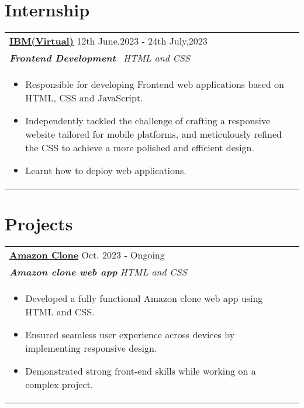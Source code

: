 \documentclass[a4paper,8pt]{article}
\begin{document}
\section{Internship}
\begin{tabularx}{\linewidth}{ @{}l r@{} }
\textbf{\uline{\href{https://adityaec2024.github.io/MyPortfolio/}{IBM(Virtual)}}} \hfill \color[HTML]{371e77} 12th June,2023  -  24th July,2023 \\[4pt]
\color[HTML]{371e77}\textbf{\textit{Frontend Development}}\ \hfill \color[HTML]{4B28A4} \textit{HTML and CSS} \\[5pt]
\begin{minipage}[t]{\linewidth}
    \begin{itemize}[nosep,after=\strut, leftmargin=2em, itemsep=2pt]
        \item Responsible for developing Frontend web applications based on HTML, CSS and JavaScript.
        \item Independently tackled the challenge of crafting a responsive 
  website tailored for mobile platforms, and meticulously refined the CSS to achieve a more polished and efficient design.
        \item Learnt how to deploy web applications.
    \end{itemize}
\end{minipage}
\end{tabularx}

\section{Projects}
\begin{tabularx}{\linewidth}{ @{}l r@{} }
\color[HTML]{1C033C} \textbf{\uline{{}{Amazon Clone}}} \hfill \color[HTML]{371e77} Oct. 2023 - Ongoing \\[4pt]
\color[HTML]{371e77}\textbf{\textit{ Amazon clone web app }} \hfill \color[HTML]{4B28A4} \textit{ HTML and CSS} \\[5pt]
\begin{minipage}[t]{\linewidth}
    \begin{itemize}[nosep,after=\strut, leftmargin=2em, itemsep=2pt]
        \item Developed a fully functional Amazon clone web app using HTML and CSS.
        \item Ensured seamless user experience across devices by implementing responsive design.
        \item Demonstrated strong front-end skills while working on a complex project.
    \end{itemize}
    \end{minipage}
\end{tabularx}
\end{document}
